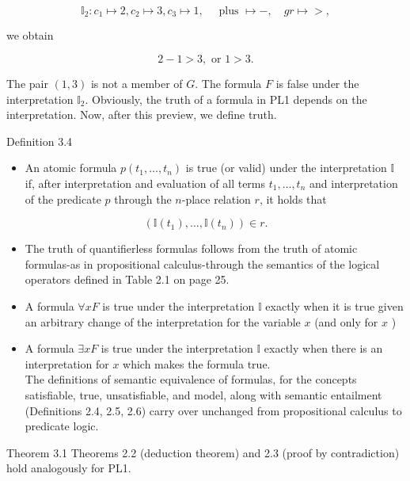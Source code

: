 \documentclass[10pt]{book}
\begin{document}
$$
\mathbb{I}_{2}: c_{1} \mapsto 2, c_{2} \mapsto 3, c_{3} \mapsto 1, \quad \text { plus } \mapsto-, \quad g r \mapsto>,
$$

we obtain

$$
2-1>3, \text { or } 1>3 .
$$

The pair $(1,3)$ is not a member of $G$. The formula $F$ is false under the interpretation $\mathbb{I}_{2}$. Obviously, the truth of a formula in PL1 depends on the interpretation. Now, after this preview, we define truth.

Definition 3.4
\begin{itemize}
  \item An atomic formula $p\left(t_{1}, \ldots, t_{n}\right)$ is true (or valid) under the interpretation $\mathbb{I}$ if, after interpretation and evaluation of all terms $t_{1}, \ldots, t_{n}$ and interpretation of the predicate $p$ through the $n$-place relation $r$, it holds that
\end{itemize}


$$
\left(\mathbb{I}\left(t_{1}\right), \ldots, \mathbb{I}\left(t_{n}\right)\right) \in r .
$$

\begin{itemize}
  \item The truth of quantifierless formulas follows from the truth of atomic formulas-as in propositional calculus-through the semantics of the logical operators defined in Table 2.1 on page 25.
  \item A formula $\forall x F$ is true under the interpretation $\mathbb{I}$ exactly when it is true given an arbitrary change of the interpretation for the variable $x$ (and only for $x$ )
  \item A formula $\exists x F$ is true under the interpretation $\mathbb{I}$ exactly when there is an interpretation for $x$ which makes the formula true.\\
The definitions of semantic equivalence of formulas, for the concepts satisfiable, true, unsatisfiable, and model, along with semantic entailment (Definitions 2.4, 2.5, 2.6) carry over unchanged from propositional calculus to predicate logic.
\end{itemize}

Theorem 3.1 Theorems 2.2 (deduction theorem) and 2.3 (proof by contradiction) hold analogously for PL1.
\end{document}
